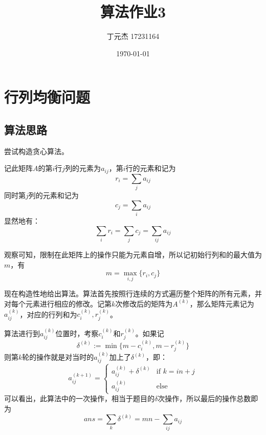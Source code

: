 \documentclass[UTF8]{ctexart}
\title{算法作业3}
\author{丁元杰 17231164}
\date{\today}
\begin{document}
\maketitle

\section{行列均衡问题}
    \subsection*{算法思路}
    尝试构造贪心算法。
    
    记此矩阵$A$的第$i$行$j$列的元素为$a_{ij}$，第$i$行的元素和记为
    $$r_i=\sum_j{a_{ij}}$$
    同时第$j$列的元素和记为
    $$c_j=\sum_i{a_{ij}}$$
    显然地有：
    $$\sum_i{r_i}=\sum_j{c_j}=\sum_{ij}{a_{ij}}$$

    观察可知，限制在此矩阵上的操作只能为元素自增，所以记初始行列和的最大值为$m$，有
    $$m = \max_{i, j}{\{r_i, c_j\}}$$

    现在构造性地给出算法。算法首先按照行连续的方式遍历整个矩阵的所有元素，并对每个元素进行相应的修改。记第$k$次修改后的矩阵为$A^{(k)}$，那么矩阵元素记为$a_{ij}^{(k)}$，对应的行列和为$c_i^{(k)}, r_j^{(k)}$。

    算法进行到$a_{ij}^{(k)}$位置时，考察$c_i^{(k)}$和$r_j^{(k)}$。如果记
    $$\delta^{(k)} := \min{\{m-c_i^{(k)}, m-r_j^{(k)}\}}$$
    则第$k$轮的操作就是对当时的$a_{ij}^{(k)}$加上了$\delta^{(k)}$，即：
    \begin{equation*}
        a_{ij}^{(k+1)}=\begin{cases}
            a_{ij}^{(k)} + \delta^{(k)} & \text{if $k=in+j$} \\
            a_{ij}^{(k)} & \text{else}
        \end{cases}
    \end{equation*}
    可以看出，此算法中的一次操作，相当于题目的$\delta$次操作，所以最后的操作总数即为
    $$ans=\sum_k{\delta^{(k)}}=mn-\sum_{ij}{a_{ij}}$$
\end{document}
